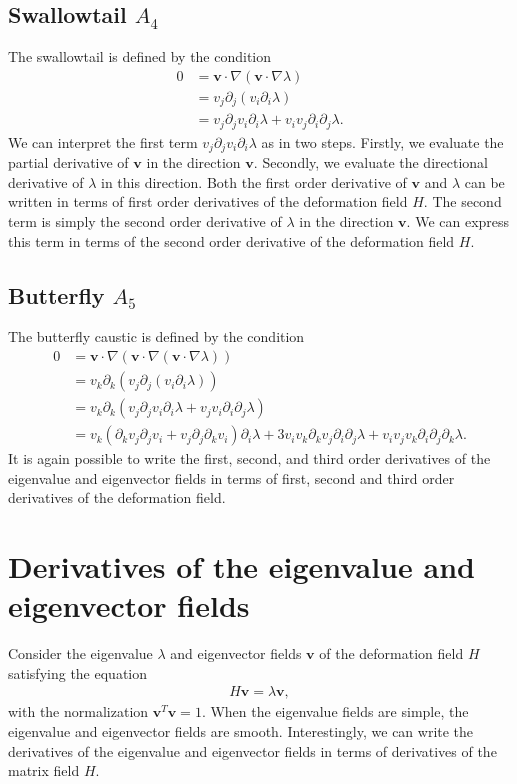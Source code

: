 \documentclass{article}
\begin{document}
\subsection{Swallowtail $A_4$}
The swallowtail is defined by the condition
\begin{align}
0
&= \bm{v} \cdot \nabla (\bm{v} \cdot \nabla \lambda)\\
&= v_j \partial_j(v_i \partial_i \lambda)\\
&= v_j \partial_j v_i \partial_i \lambda + v_i v_j   \partial_i \partial_j \lambda.
\end{align}
We can interpret the first term $v_j \partial_j v_i \partial_i \lambda $ as in two steps. Firstly, we evaluate the partial derivative of $\bm{v}$ in the direction $\bm{v}$. Secondly, we evaluate the directional derivative of $\lambda$ in this direction. Both the first order derivative of $\bm{v}$ and $\lambda$ can be written in terms of first order derivatives of the deformation field $H$. The second term is simply the second order derivative of $\lambda$ in the direction $\bm{v}$. We can express this term in terms of the second order derivative of the deformation field $H$.



\subsection{Butterfly $A_5$}
The butterfly caustic is defined by the condition
\begin{align}
0
&=\bm{v}\cdot \nabla( \bm{v} \cdot \nabla (\bm{v} \cdot \nabla \lambda))\\
&= v_k \partial_k(v_j \partial_j(v_i \partial_i \lambda))\\
&= v_k \partial_k(v_j \partial_j v_i \partial_i \lambda + v_j  v_i \partial_i \partial_j \lambda)\\
&= 
v_k (\partial_k v_j \partial_j v_i + v_j \partial_j\partial_k v_i)\partial_i \lambda 
+ 3 v_i v_k \partial_k v_j \partial_i \partial_j \lambda
+ v_i v_j v_k \partial_i \partial_j \partial_k \lambda.
\end{align}
It is again possible to write the first, second, and third order derivatives of the eigenvalue and eigenvector fields in terms of first, second and third order derivatives of the deformation field. 

\section{Derivatives of the eigenvalue and eigenvector fields}
Consider the eigenvalue $\lambda$ and eigenvector fields $\bm{v}$ of the deformation field $H$ satisfying the equation
\begin{align}
H \bm{v} = \lambda \bm{v},
\end{align}
with the normalization $\bm{v}^T\bm{v}=1$. When the eigenvalue fields are simple, the eigenvalue and eigenvector fields are smooth. Interestingly, we can write the derivatives of the eigenvalue and eigenvector fields in terms of derivatives of the matrix field $H$.
\end{document}
